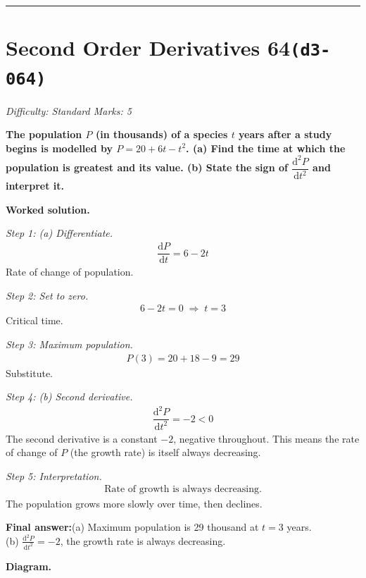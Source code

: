 \documentclass[11pt]{article}
\newcommand{\question}[1]{\par\medskip\noindent\textbf{#1}\par}
\begin{document}
\medskip\hrule

\section*{Second Order Derivatives 64\quad\small\texttt{(d3-064)}}
\textit{Difficulty: Standard \quad\textbar\quad Marks: 5}

\question{The population \( P \) (in thousands) of a species \( t \) years after a study begins is modelled by \( P = 20 + 6t - t^2 \). (a) Find the time at which the population is greatest and its value. (b) State the sign of \( \dfrac{\mathrm{d}^2P}{\mathrm{d}t^2} \) and interpret it.}

\textbf{Worked solution.}

\textit{Step 1: (a) Differentiate.}
\[\begin{gathered}
\dfrac{\mathrm{d}P}{\mathrm{d}t} = 6 - 2t
\end{gathered}\]
Rate of change of population.

\textit{Step 2: Set to zero.}
\[\begin{gathered}
6 - 2t = 0 \;\Rightarrow\; t = 3
\end{gathered}\]
Critical time.

\textit{Step 3: Maximum population.}
\[\begin{gathered}
P(3) = 20 + 18 - 9 = 29
\end{gathered}\]
Substitute.

\textit{Step 4: (b) Second derivative.}
\[\begin{gathered}
\dfrac{\mathrm{d}^2P}{\mathrm{d}t^2} = -2 < 0
\end{gathered}\]
The second derivative is a constant \(-2\), negative throughout. This means the rate of change of \(P\) (the growth rate) is itself always decreasing.

\textit{Step 5: Interpretation.}
\[\begin{gathered}
\text{Rate of growth is always decreasing.}
\end{gathered}\]
The population grows more slowly over time, then declines.

\begin{answerbox}
\textbf{Final answer:}\quad (a) Maximum population is 29 thousand at \(\displaystyle  t = 3 \) years. \\[3pt]  (b) \(\displaystyle  \tfrac{\mathrm{d}^2P}{\mathrm{d}t^2} = -2 \), the growth rate is always decreasing.
\end{answerbox}
\textbf{Diagram.}
\end{document}
